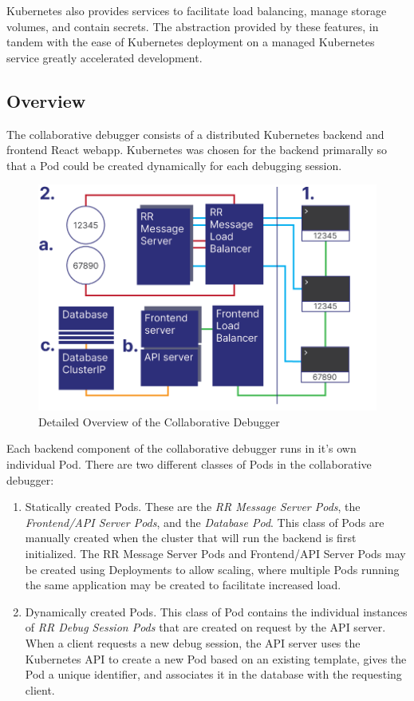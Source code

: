 \documentclass[12pt]{article}
\begin{document}
Kubernetes also provides services to facilitate load balancing, manage
storage volumes, and contain secrets.  The abstraction provided by
these features, in tandem with the ease of Kubernetes deployment on a
managed Kubernetes service\cite{do_managed_k8s} greatly accelerated
development.

\subsection{Overview}

The collaborative debugger consists of a distributed Kubernetes
backend and frontend React webapp.  Kubernetes was chosen for the
backend primarally so that a Pod could be created dynamically for each
debugging session.  

\begin{figure}[h!]

  \includegraphics[scale=.9]{detailed_system}
  \centering
  \caption{Detailed Overview of the Collaborative Debugger}
  \label{debugger:detailedoverview}
\end{figure}

Each backend component of the collaborative debugger runs in it's own
individual Pod.  There are two different classes of Pods in the
collaborative debugger:

\begin{enumerate}
\item Statically created Pods.  These are the \textit{RR Message
    Server Pods}, the \textit{Frontend/API Server Pods}, and the
  \textit{Database Pod}.  This class of Pods are manually created when
  the cluster that will run the backend is first initialized.  The RR
  Message Server Pods and Frontend/API Server Pods may be created
  using Deployments \cite{k8s_docs} to allow scaling, where multiple
  Pods running the same application may be created to facilitate
  increased load.
\item Dynamically created Pods.  This class of Pod contains the
  individual instances of \textit{RR Debug Session Pods} that are
  created on request by the API server.  When a client requests a new
  debug session, the API server uses the Kubernetes API to create a
  new Pod based on an existing template, gives the Pod a unique
  identifier, and associates it in the database with the requesting
  client.
\end{enumerate}
\end{document}
